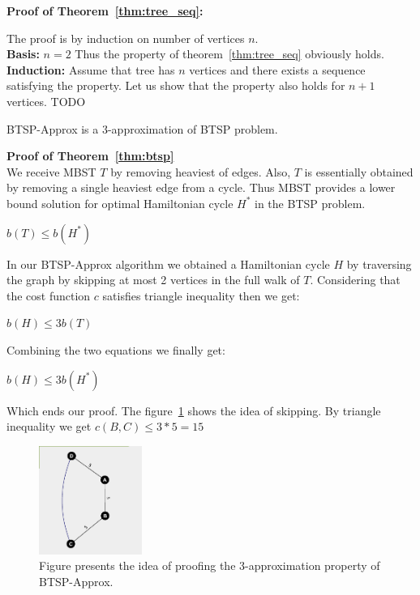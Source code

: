 \documentclass[runningheads, a4paper]{llncs}
\begin{document}
\textbf {Proof of Theorem~\ref{thm:tree_seq}:}

The proof is by induction on number of vertices $n$. \\
\textbf{Basis:} $n=2$ Thus the property of theorem~\ref{thm:tree_seq} obviously holds.\\
\textbf{Induction:} Assume that tree has $n$ vertices and there exists a sequence satisfying the property. Let us show that the property also holds for $n+1$ vertices.
TODO

\begin{theorem} \label{thm:btsp}
    BTSP-Approx is a 3-approximation of BTSP problem.
\end{theorem}

\textbf {Proof of Theorem~\ref{thm:btsp}}\\
        
We receive MBST $T$ by removing heaviest of edges. Also, $T$ is essentially obtained by removing a single heaviest edge from a cycle. Thus MBST provides a lower bound solution for optimal Hamiltonian cycle $H^*$ in the BTSP problem.
\begin{center}
    $b(T) \leq b(H^*)$
\end{center}

In our BTSP-Approx algorithm we obtained a Hamiltonian cycle $H$ by traversing the graph by skipping at most 2 vertices in the full walk of $T$. Considering that the cost function $c$ satisfies triangle inequality then we get:

\begin{center}
    $b(H) \leq 3b(T)$
\end{center}

Combining the two equations we finally get:

\begin{center}
    $b(H) \leq 3b(H^*)$
\end{center}
Which  ends our proof.
The figure~\ref{fig:3approx_proof} shows the idea of skipping. By triangle inequality we get $c(B,C) \leq 3 * 5 = 15$
\begin{figure}[H]
    \includegraphics[width=0.30\textwidth]{res/3approx_proof.png}
    \caption{Figure presents the idea of proofing the 3-approximation property of BTSP-Approx.}
    \label{fig:3approx_proof}
\end{figure}
\end{document}
